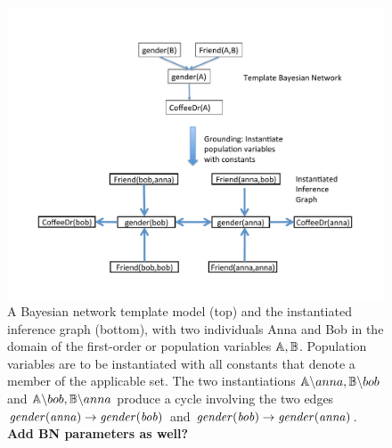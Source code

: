 \documentclass[twoside,11pt]{article}
\begin{document}
\begin{table}[htdp]
\caption{Dependency Networks vs. Bayesian Networks}
\begin{center}
\end{center}
\label{table:bn-dn}
\end{table}%
 
 

\begin{figure}[htbp]
\begin{center}
\includegraphics[width = 0.7 \textwidth]{figures/bn}
\caption{A Bayesian network template model (top) and the instantiated inference graph (bottom), with two individuals Anna and Bob in the domain of the first-order or population variables $\mathbb{A},\mathbb{B}$. Population variables are to be instantiated with all constants that denote a member of the applicable set. The two instantiations $\mathbb{A}\backslash anna,\mathbb{B} \backslash bob$ and $\mathbb{A}\backslash bob,\mathbb{B}\backslash anna$ produce a cycle involving the two  edges $\it{gender}(anna) \rightarrow \it{gender}(bob)$ and $\it{gender}(bob) \rightarrow \it{gender}(anna)$. \label{fig:bn} \textbf{Add BN parameters as well?}}
\end{center}
\end{figure}
\end{document}
